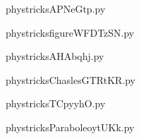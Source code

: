     \newcommand{\CaptionFigAPNeGtp}{<+Type your caption here+>}
    \begin{center}
        
    \end{center}
    phystricksAPNeGtp.py

    

    \clearpage
    


    \newcommand{\CaptionFigfigureWFDTzSN}{<+Type your caption here+>}
    \begin{center}
        
    \end{center}
    phystricksfigureWFDTzSN.py

    

    \clearpage
    


    \newcommand{\CaptionFigAHAbqhj}{<+Type your caption here+>}
    \begin{center}
        
    \end{center}
    phystricksAHAbqhj.py

    

    \clearpage
    


    \newcommand{\CaptionFigChaslesGTRtKR}{<+Type your caption here+>}
    \begin{center}
        
    \end{center}
    phystricksChaslesGTRtKR.py

    

    \clearpage
    


    \newcommand{\CaptionFigTCpyyhO}{<+Type your caption here+>}
    \begin{center}
        
    \end{center}
    phystricksTCpyyhO.py

    

    \clearpage
    


    \newcommand{\CaptionFigParaboleoytUKk}{<+Type your caption here+>}
    \begin{center}
        
    \end{center}
    phystricksParaboleoytUKk.py


